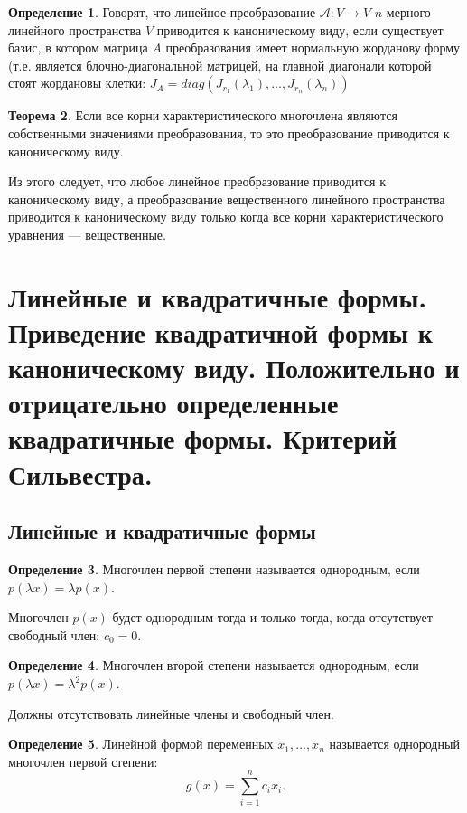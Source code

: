 \documentclass[12pt]{report}
\theoremstyle{definition}
\newtheorem{theorem}{Теорема}[chapter]
\newtheorem{definition}[theorem]{Определение}
\newcommand{\A}{\mathcal A}
\begin{document}
\begin{definition}
Говорят, что линейное преобразование $\A: V \rightarrow V$
$n$-мерного линейного пространства $V$ приводится к каноническому виду,
если существует базис, в котором матрица $A$ преобразования имеет
нормальную жорданову форму (т.е. является блочно-диагональной матрицей,
на главной диагонали которой стоят жордановы клетки:
$J_A = diag(J_{r_1}(\lambda_1), \dots, J_{r_n}(\lambda_n))$
\end{definition}

\begin{theorem}
Если все корни характеристического многочлена являются
собственными значениями преобразования, то это преобразование
приводится к каноническому виду.
\end{theorem}

Из этого следует, что любое линейное преобразование приводится
к каноническому виду, а преобразование вещественного линейного
пространства приводится к каноническому виду только когда все корни
характеристического уравнения --- вещественные.


\section
{
  Линейные и квадратичные формы.
  Приведение квадратичной формы к каноническому виду.
  Положительно и отрицательно определенные квадратичные формы.
  Критерий Сильвестра.
}

\subsection{Линейные и квадратичные формы}

\begin{definition}
Многочлен первой степени называется однородным, если
$p(\lambda x) = \lambda p(x)$.
\end{definition}

Многочлен $p(x)$ будет однородным тогда и только тогда, когда
отсутствует свободный член: $c_0 = 0$.

\begin{definition}
Многочлен второй степени называется однородным, если
$p(\lambda x) = \lambda^2 p(x)$.
\end{definition}

Должны отсутствовать линейные члены и свободный член.

\begin{definition}
Линейной формой переменных $x_1, \dots, x_n$ называется однородный
многочлен первой степени:
$$
g(x) = \sum\limits_{i=1}^n c_i x_i.
$$
\end{definition}
\end{document}
